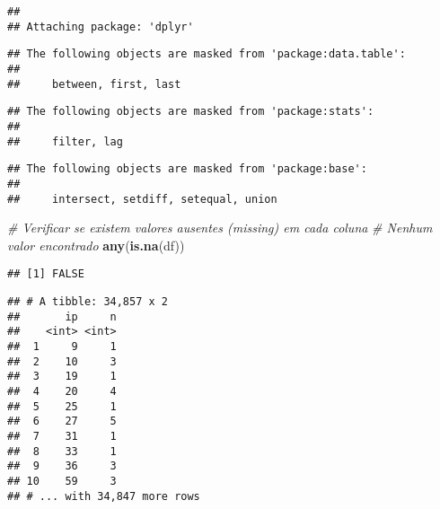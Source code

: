 \documentclass[]{article}
\newenvironment{Shaded}{\begin{snugshade}}{\end{snugshade}}
\newcommand{\CommentTok}[1]{\textcolor[rgb]{0.56,0.35,0.01}{\textit{#1}}}
\newcommand{\KeywordTok}[1]{\textcolor[rgb]{0.13,0.29,0.53}{\textbf{#1}}}
\newcommand{\NormalTok}[1]{#1}
\newcommand{\OperatorTok}[1]{\textcolor[rgb]{0.81,0.36,0.00}{\textbf{#1}}}
\newcommand{\StringTok}[1]{\textcolor[rgb]{0.31,0.60,0.02}{#1}}
\begin{document}
\begin{verbatim}
## 
## Attaching package: 'dplyr'
\end{verbatim}

\begin{verbatim}
## The following objects are masked from 'package:data.table':
## 
##     between, first, last
\end{verbatim}

\begin{verbatim}
## The following objects are masked from 'package:stats':
## 
##     filter, lag
\end{verbatim}

\begin{verbatim}
## The following objects are masked from 'package:base':
## 
##     intersect, setdiff, setequal, union
\end{verbatim}

\begin{Shaded}
\begin{Highlighting}[]
\CommentTok{# Verificar se existem valores ausentes (missing) em cada coluna}
\CommentTok{# Nenhum valor encontrado}
\KeywordTok{any}\NormalTok{(}\KeywordTok{is.na}\NormalTok{(df))}
\end{Highlighting}
\end{Shaded}

\begin{verbatim}
## [1] FALSE
\end{verbatim}

\begin{Shaded}
\end{Shaded}

\begin{verbatim}
## # A tibble: 34,857 x 2
##       ip     n
##    <int> <int>
##  1     9     1
##  2    10     3
##  3    19     1
##  4    20     4
##  5    25     1
##  6    27     5
##  7    31     1
##  8    33     1
##  9    36     3
## 10    59     3
## # ... with 34,847 more rows
\end{verbatim}

\begin{Shaded}
\end{Shaded}
\end{document}
